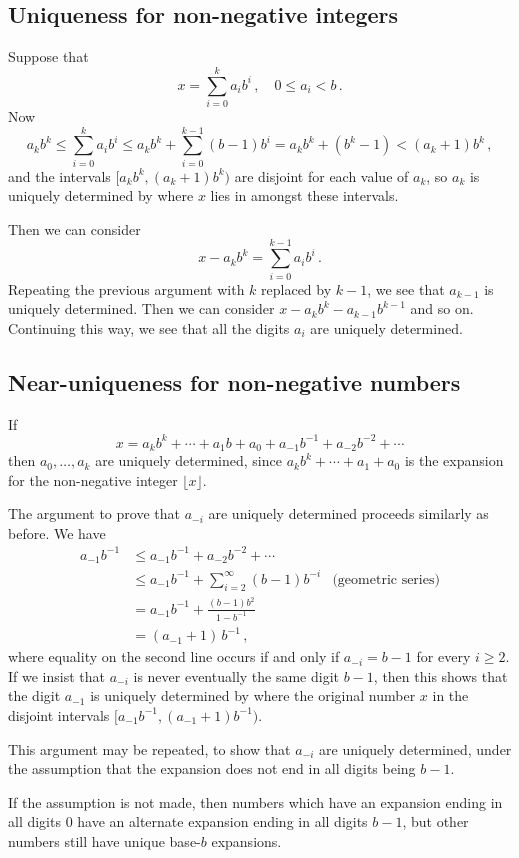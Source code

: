 \documentclass[12pt]{article}
\begin{document}
\subsection{Uniqueness for non-negative integers}
Suppose that
\[
x = \sum_{i=0}^k a_i b^i\,, \quad 0 \leq a_i < b\,.
\]
Now 
\[
a_k b^k \leq \sum_{i=0}^k a_i b^i \leq a_k b^k + \sum_{i=0}^{k-1} (b-1) b^i = a_k b^k + (b^k - 1) < (a_k + 1)b^k\,,
\]
and the intervals $[a_k b^k, (a_k+1)b^k)$ are disjoint for each
value of $a_k$, so $a_k$ is uniquely determined by where $x$ lies
in amongst these intervals.

Then we can consider
\[
x - a_k b^k = \sum_{i=0}^{k-1} a_i b^i\,.
\]
Repeating the previous argument with $k$ replaced by $k-1$,
we see that $a_{k-1}$ is uniquely determined.
Then we can consider $x - a_k b^k - a_{k-1} b^{k-1}$ and so on.
Continuing this way, we see that all the digits $a_i$ are uniquely
determined.

\subsection{Near-uniqueness for non-negative numbers}
If
\[
x = a_k b^k + \dotsb + a_1 b + a_0 + a_{-1} b^{-1} + a_{-2} b^{-2} + \dotsb
\]
then $a_0, \dotsc, a_k$ are uniquely determined,
since $a_k b^k + \dotsb + a_1 + a_0$ 
is the expansion for the non-negative integer $\lfloor x \rfloor$.

The argument to prove that $a_{-i}$ are uniquely determined proceeds
similarly as before.
We have
\begin{align*}
a_{-1} b^{-1} &\leq a_{-1} b^{-1} + a_{-2} b^{-2} + \dotsb \\
&\leq a_{-1} b^{-1} + \sum_{i=2}^\infty (b-1) b^{-i} 
& \text{(geometric series)}
\\
&= a_{-1} b^{-1} + \frac{(b-1)b^2}{1-b^{-1}} \\
&= (a_{-1}+1)\, b^{-1}\,,
\end{align*}
where equality on the second line occurs if and only if 
$a_{-i} = b-1$ for every $i \geq 2$.
If we insist that $a_{-i}$ is never eventually the same
digit $b-1$,
then this shows that the digit $a_{-1}$ is uniquely determined by 
where the original number $x$ in the disjoint intervals $[a_{-1} b^{-1}, (a_{-1} + 1) b^{-1})$.

This argument may be repeated, to show that $a_{-i}$ are uniquely
determined, under the assumption that the expansion
does not end in all digits being $b-1$.

If the assumption is not made, then
numbers which have an expansion ending in all digits $0$
have an alternate expansion ending in all digits $b-1$,
but other numbers still have unique base-$b$ expansions.
\end{document}
